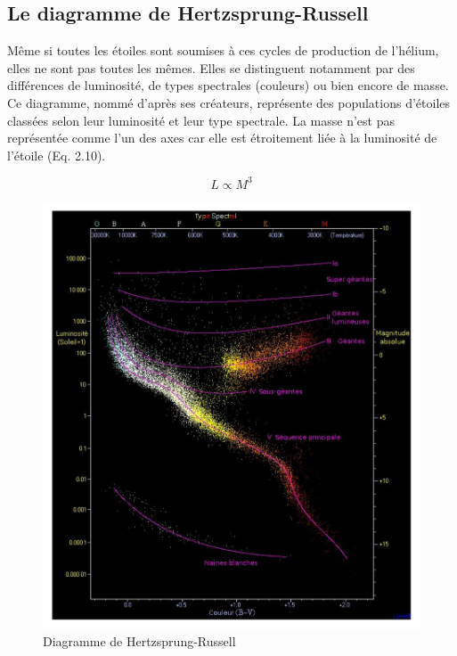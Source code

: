 \subsection{Le diagramme de Hertzsprung-Russell}

Même si toutes les étoiles sont soumises à ces cycles de production de l’hélium, elles ne sont pas toutes les mêmes. Elles se distinguent notamment par des différences de luminosité, de types spectrales (couleurs) ou bien encore de masse. Ce diagramme, nommé d’après ses créateurs, représente des populations d’étoiles classées selon leur luminosité et leur type spectrale. La masse n’est pas représentée comme l’un des axes car elle est étroitement liée à la luminosité de l’étoile (Eq. 2.10).

\begin{center}
\begin{equation}L \propto M^{3}\end{equation}
\end{center}\newpage

\begin{figure}[H]\vspace{1cm}
	\centering
	\includegraphics[scale=0.4]{images/hr-diagram}
	\caption{Diagramme de Hertzsprung-Russell}
\end{figure}\bigskip

